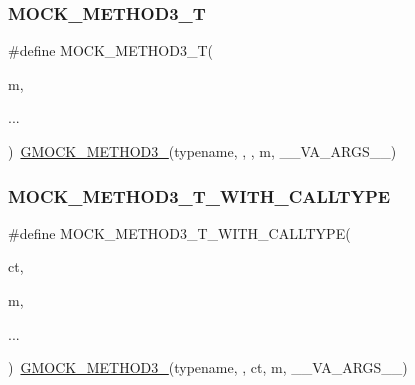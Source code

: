 \mbox{\label{googletest-master_2googlemock_2include_2gmock_2gmock-generated-function-mockers_8h_a0b1576f68e6161f106e3d9ee7e3ac28b}} 
\subsubsection{\texorpdfstring{MOCK\_METHOD3\_T}{MOCK\_METHOD3\_T}}
{\footnotesize\ttfamily \#define M\+O\+C\+K\+\_\+\+M\+E\+T\+H\+O\+D3\+\_\+T(\begin{DoxyParamCaption}\item[{}]{m,  }\item[{}]{... }\end{DoxyParamCaption})~\mbox{\hyperlink{_obj__test_2lib_2googletest-release-1_88_81_2googlemock_2include_2gmock_2gmock-generated-function-mockers_8h_af7c77ba511c631de02bb8c45a6ed3045}{G\+M\+O\+C\+K\+\_\+\+M\+E\+T\+H\+O\+D3\+\_\+}}(typename, , , m, \+\_\+\+\_\+\+V\+A\+\_\+\+A\+R\+G\+S\+\_\+\+\_\+)}

\mbox{\label{googletest-master_2googlemock_2include_2gmock_2gmock-generated-function-mockers_8h_a1e723cc1c62c9fedb9f54ee30c111047}} 
\subsubsection{\texorpdfstring{MOCK\_METHOD3\_T\_WITH\_CALLTYPE}{MOCK\_METHOD3\_T\_WITH\_CALLTYPE}}
{\footnotesize\ttfamily \#define M\+O\+C\+K\+\_\+\+M\+E\+T\+H\+O\+D3\+\_\+\+T\+\_\+\+W\+I\+T\+H\+\_\+\+C\+A\+L\+L\+T\+Y\+PE(\begin{DoxyParamCaption}\item[{}]{ct,  }\item[{}]{m,  }\item[{}]{... }\end{DoxyParamCaption})~\mbox{\hyperlink{_obj__test_2lib_2googletest-release-1_88_81_2googlemock_2include_2gmock_2gmock-generated-function-mockers_8h_af7c77ba511c631de02bb8c45a6ed3045}{G\+M\+O\+C\+K\+\_\+\+M\+E\+T\+H\+O\+D3\+\_\+}}(typename, , ct, m, \+\_\+\+\_\+\+V\+A\+\_\+\+A\+R\+G\+S\+\_\+\+\_\+)}

